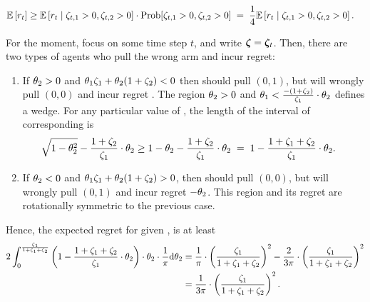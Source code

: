 \begin{align*}
\Expect{\Regret{t}} 
  & \geq \ExpectC{\Regret{t}}{\Noise[t]{1} > 0, \Noise[t]{2} > 0}
         \cdot \Prob{\Noise[t]{1} > 0, \Noise[t]{2} > 0}
  \; = \; \quarter \ExpectC{\Regret{t}}{\Noise[t]{1} > 0, \Noise[t]{2} > 0}.
\end{align*}

For the moment, focus on some time step $t$,
and write $\NoiseV = \NoiseV[t]$.
Then, there are two types of agents who pull the wrong arm and incur
regret:
\begin{enumerate}
\item If $\Ag{2} > 0$ and $\Ag{1} \Noise{1} + \Ag{2} (1+\Noise{2}) < 0$
then \AgV should pull $(0,1)$,
but will wrongly pull $(0,0)$ and incur regret .
The region
$\Ag{2} > 0$ and $\Ag{1} < \frac{-(1+\Noise{2})}{\Noise{1}} \cdot \Ag{2}$
defines a wedge.
For any particular value of ,
the length of the interval of corresponding  is
\begin{align*}
  \sqrt{1-\Ag{2}^2} - \frac{1+\Noise{2}}{\Noise{1}} \cdot \Ag{2}
  & \geq 1 - \Ag{2} - \frac{1+\Noise{2}}{\Noise{1}} \cdot \Ag{2}
  \; = \; 1 - \frac{1+\Noise{1}+\Noise{2}}{\Noise{1}} \cdot \Ag{2}.
\end{align*}

\item If $\Ag{2} < 0$ and $\Ag{1} \Noise{1} + \Ag{2} (1+\Noise{2}) > 0$,
then \Ag should pull $(0,0)$,
but will wrongly pull $(0,1)$ and incur regret $-\Ag{2}$.
This region and its regret are rotationally symmetric to the previous
case.
\end{enumerate}

Hence, the expected regret for given ,  is at least
\begin{align*}
  2 \int_0^{\frac{\Noise{1}}{1+\Noise{1}+\Noise{2}}}
  \left( 1 - \frac{1+\Noise{1}+\Noise{2}}{\Noise{1}} \cdot \Ag{2} \right)
  \cdot \Ag{2} \cdot \frac{1}{\pi} \dd \Ag{2}
& =
\frac{1}{\pi} \cdot \left(\frac{\Noise{1}}{1+\Noise{1}+\Noise{2}}\right)^2
- \frac{2}{3 \pi} \cdot \left(\frac{\Noise{1}}{1+\Noise{1}+\Noise{2}}\right)^2
\\ & =
\frac{1}{3 \pi} \cdot \left(\frac{\Noise{1}}{1+\Noise{1}+\Noise{2}}\right)^2.
\end{align*}

  
